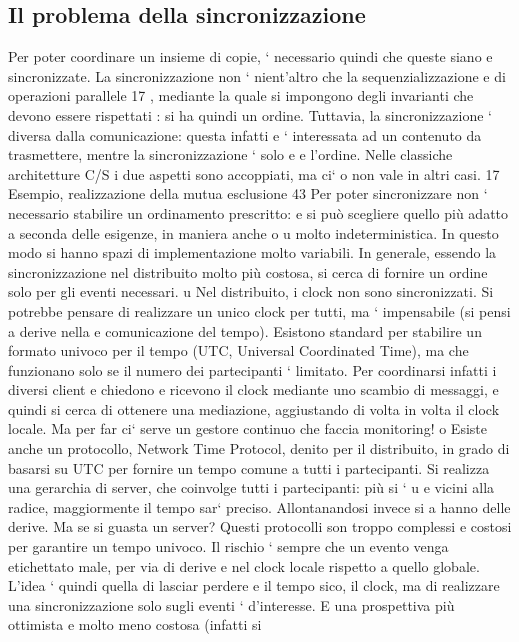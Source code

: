 \documentclass[a4paper,12pt]{article}
\begin{document}
\subsection{Il problema della sincronizzazione}
Per poter coordinare un insieme di copie, ` necessario quindi che queste siano
e
sincronizzate. La sincronizzazione non ` nient'altro che la sequenzializzazione
e
di operazioni parallele 17 , mediante la quale si impongono degli invarianti che
devono essere rispettati : si ha quindi un ordine.
Tuttavia, la sincronizzazione ` diversa dalla comunicazione: questa infatti
e
` interessata ad un contenuto da trasmettere, mentre la sincronizzazione ` solo
e
e
l'ordine. Nelle classiche architetture C/S i due aspetti sono accoppiati, ma ci`
o
non vale in altri casi.
17 Esempio,
realizzazione della mutua esclusione
43
Per poter sincronizzare non ` necessario stabilire un ordinamento prescritto:
e
si può scegliere quello più adatto a seconda delle esigenze, in maniera anche
o
u
molto indeterministica. In questo modo si hanno spazi di implementazione
molto variabili. In generale, essendo la sincronizzazione nel distribuito molto
più costosa, si cerca di fornire un ordine solo per gli eventi necessari.
u
Nel distribuito, i clock non sono sincronizzati. Si potrebbe pensare di realizzare un unico clock per tutti, ma `
impensabile (si pensi a derive nella
e
comunicazione del tempo). Esistono standard per stabilire un formato univoco per il tempo (UTC, Universal Coordinated
Time), ma che funzionano solo
se il numero dei partecipanti ` limitato. Per coordinarsi infatti i diversi client
e
chiedono e ricevono il clock mediante uno scambio di messaggi, e quindi si cerca
di ottenere una mediazione, aggiustando di volta in volta il clock locale. Ma per
far ci` serve un gestore continuo che faccia monitoring!
o
Esiste anche un protocollo, Network Time Protocol, denito per il distribuito,
in grado di basarsi su UTC per fornire un tempo comune a tutti i partecipanti.
Si realizza una gerarchia di server, che coinvolge tutti i partecipanti: più si `
u e
vicini alla radice, maggiormente il tempo sar` preciso. Allontanandosi invece si
a
hanno delle derive. Ma se si guasta un server?
Questi protocolli son troppo complessi e costosi per garantire un tempo univoco. Il rischio ` sempre che un evento venga
etichettato male, per via di derive
e
nel clock locale rispetto a quello globale. L'idea ` quindi quella di lasciar perdere
e
il tempo sico, il clock, ma di realizzare una sincronizzazione solo sugli eventi
`
d'interesse. E una prospettiva più ottimista e molto meno costosa (infatti si
\end{document}
